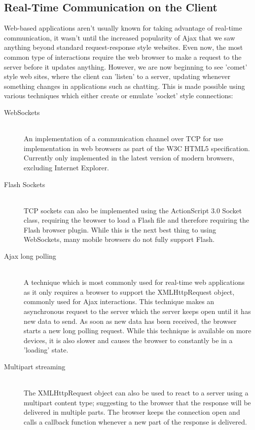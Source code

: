 \documentclass[a4papert,11pt,notitlepage]{ltxdoc}
\begin{document}
\subsection{Real-Time Communication on the Client}
Web-based applications aren't usually known for taking advantage of real-time communication, it wasn't until the increased popularity of Ajax that we saw anything beyond standard request-response style websites. Even now, the most common type of interactions require the web browser to make a request to the server before it updates anything. However, we are now beginning to see 'comet'\cite{crane:comet} style web sites, where the client can 'listen' to a server, updating whenever something changes in applications such as chatting. This is made possible using various techniques which either create or emulate 'socket' style connections:
\begin{description}
\item[WebSockets] \hfill \\
An implementation of a communication channel over TCP for use implementation in web browsers as part of the W3C HTML5 specification. Currently only implemented in the latest version of modern browsers, excluding Internet Explorer.
\item[Flash Sockets] \hfill \\
TCP sockets can also be implemented using the ActionScript 3.0 Socket class, requiring the browser to load a Flash file and therefore requiring the Flash browser plugin. While this is the next best thing to using WebSockets, many mobile browsers do not fully support Flash.
\item[Ajax long polling] \hfill \\
A technique which is most commonly used for real-time web applications as it only requires a browser to support the XMLHttpRequest object, commonly used for Ajax interactions. This technique makes an asynchronous request to the server which the server keeps open until it has new data to send. As soon as new data has been received, the browser starts a new long polling request. While this technique is available on more devices, it is also slower and causes the browser to constantly be in a 'loading' state.
\item[Multipart streaming] \hfill \\
The XMLHttpRequest object can also be used to react to a server using a multipart content type; suggesting to the browser that the response will be delivered in multiple parts. The browser keeps the connection open and calls a callback function whenever a new part of the response is delivered.
\end{description}
\end{document}
